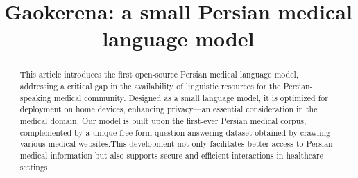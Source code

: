 \documentclass[conference]{IEEEtran}
\begin{document}
\title{Gaokerena: a small Persian medical language model}

\author{
\and
{}
\and
{}
\and
{}
\and
{}
\and
{}
}

\maketitle

\begin{abstract}
This article introduces the first open-source Persian medical language model, addressing a critical gap in the availability of linguistic resources for the Persian-speaking medical community. Designed as a small language model, it is optimized for deployment on home devices, enhancing privacy—an essential consideration in the medical domain. Our model is built upon the first-ever Persian medical corpus, complemented by a unique free-form question-answering dataset obtained by crawling various medical websites.This development not only facilitates better access to Persian medical information but also supports secure and efficient interactions in healthcare settings.
\end{abstract}
\end{document}
